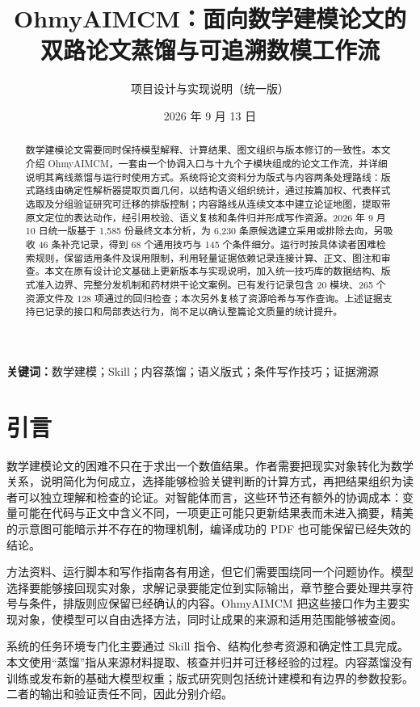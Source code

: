 \documentclass[UTF8,a4paper,zihao=-4,fontset=fandol]{ctexart}
\title{\bfseries OhmyAIMCM：面向数学建模论文的\\双路论文蒸馏与可追溯数模工作流}
\author{项目设计与实现说明（统一版）}
\date{2026 年 9 月 13 日}
\newcommand{\sys}{\textsf{OhmyAIMCM}}
\begin{document}
\maketitle
\begin{abstract}
数学建模论文需要同时保持模型解释、计算结果、图文组织与版本修订的一致性。本文介绍 OhmyAIMCM，一套由一个协调入口与十九个子模块组成的论文工作流，并详细说明其离线蒸馏与运行时使用方式。系统将论文资料分为版式与内容两条处理路线：版式路线由确定性解析器提取页面几何，以结构语义组织统计，通过按篇加权、代表样式选取及分组验证研究可迁移的排版控制；内容路线从连续文本中建立论证地图，提取带原文定位的表达动作，经引用校验、语义复核和条件归并形成写作资源。2026 年 9 月 10 日统一版基于 1,585 份最终文本分析，为 6,230 条原候选建立采用或排除去向，另吸收 46 条补充记录，得到 68 个通用技巧与 145 个条件细分。运行时按具体读者困难检索规则，保留适用条件及误用限制，利用轻量证据依赖记录连接计算、正文、图注和审查。本文在原有设计论文基础上更新版本与实现说明，加入统一技巧库的数据结构、版式准入边界、完整分发机制和药材烘干论文案例。已有发行记录包含 20 模块、265 个资源文件及 128 项通过的回归检查；本次另外复核了资源哈希与写作查询。上述证据支持已记录的接口和局部表达行为，尚不足以确认整篇论文质量的统计提升。

\end{abstract}
\noindent\textbf{关键词：}数学建模；Skill；内容蒸馏；语义版式；条件写作技巧；证据溯源

\section{引言}

数学建模论文的困难不只在于求出一个数值结果。作者需要把现实对象转化为数学关系，说明简化为何成立，选择能够检验关键判断的计算方式，再把结果组织为读者可以独立理解和检查的论证。对智能体而言，这些环节还有额外的协调成本：变量可能在代码与正文中含义不同，一项更正可能只更新结果表而未进入摘要，精美的示意图可能暗示并不存在的物理机制，编译成功的 PDF 也可能保留已经失效的结论。

方法资料、运行脚本和写作指南各有用途，但它们需要围绕同一个问题协作。模型选择要能够接回现实对象，求解记录要能定位到实际输出，章节整合要处理共享符号与条件，排版则应保留已经确认的内容。\sys{} 把这些接口作为主要实现对象，使模型可以自由选择方法，同时让成果的来源和适用范围能够被查阅。

系统的任务环境专门化主要通过 Skill 指令、结构化参考资源和确定性工具完成。本文使用“蒸馏”指从来源材料提取、核查并归并可迁移经验的过程。内容蒸馏没有训练或发布新的基础大模型权重；版式研究则包括统计建模和有边界的参数投影。二者的输出和验证责任不同，因此分别介绍。
\end{document}
